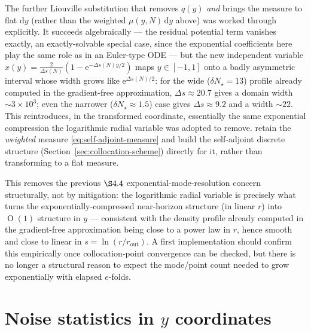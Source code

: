 \documentclass[a4paper,11pt]{article}
\newcommand{\semibold}[1]{{\fontseries{b}\selectfont{#1}}}
\DeclareMathOperator{\Or}{O}
\renewcommand{\d}{\mathrm{d}}
\newcommand{\e}[1]{\mathrm{e}^{{#1}}}
\newenvironment{panel}{\begin{tcolorbox}[enhanced,breakable,colback=gray!10,colframe=gray!30]\small}{\end{tcolorbox}}
\newcommand{\Ny}{N}                          %
\newcommand{\dNstar}{\delta N_\star}         %
\newcommand{\rad}{r}                         %
\newcommand{\yco}{y}                         %
\newcommand{\rout}{\rad_{\mathrm{out}}}      %
\newcommand{\Deltas}{\Delta s}                %
\newcommand{\measure}{\mu}                   %
\begin{document}
\begin{panel}
\semibold{Flat-measure (Schrödinger normal) form: explored and set aside.}
The further Liouville substitution that removes $q(\yco)$ \emph{and}
brings the measure to flat $\d\yco$ (rather than the weighted
$\measure(\yco,\Ny)\,\d\yco$ above) was worked through explicitly. It
succeeds algebraically --- the residual potential term vanishes exactly,
an exactly-solvable special case, since the exponential coefficients here
play the same role as in an Euler-type ODE --- but the new independent
variable $x(\yco)=\tfrac{2}{\Deltas(\Ny)}(1-\e{-\Deltas(\Ny)\yco/2})$ maps
$\yco\in[-1,1]$ onto a badly asymmetric interval whose width grows like
$\e{\Deltas(\Ny)/2}$: for the wide ($\dNstar=13$) profile already computed
in the gradient-free approximation, $\Deltas\approx20.7$ gives a domain
width $\sim3\times10^3$; even the narrower ($\dNstar\approx1.5$) case gives
$\Deltas\approx9.2$ and a width $\sim22$. This reintroduces, in the
transformed coordinate, essentially the same exponential compression the
logarithmic radial variable was adopted to remove. \semibold{Conclusion:}
retain the \emph{weighted} measure \eqref{eq:self-adjoint-measure} and
build the self-adjoint discrete structure (Section~\ref{sec:collocation-scheme})
directly for it, rather than transforming to a flat measure.
\end{panel}

This removes the previous $\S4.4$ exponential-mode-resolution concern
structurally, not by mitigation: the logarithmic radial variable is
precisely what turns the exponentially-compressed near-horizon structure
(in linear $\rad$) into $\Or(1)$ structure in $\yco$ --- consistent with
the density profile already computed in the gradient-free approximation
being close to a power law in $\rad$, hence smooth and close to linear in
$s=\ln(\rad/\rout)$. A first implementation should confirm this
empirically once collocation-point convergence can be checked, but there
is no longer a structural reason to expect the mode/point count needed to
grow exponentially with elapsed $e$-folds.

\section{Noise statistics in $\yco$ coordinates}
\label{sec:noise-y}
\end{document}

